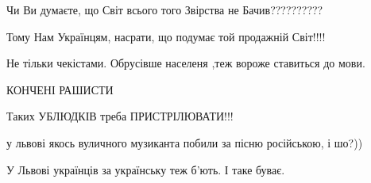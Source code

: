 \begin{itemize}
\begin{itemize}
Чи Ви думаєте, що Світ всього того Звірства не Бачив??????????

Тому Нам Українцям, насрати, що подумає той продажній Світ!!!!🖕🖕🖕

\end{itemize}

 
Не тільки чекістами. Обрусівше населеня ,теж вороже ставиться до мови.

 
КОНЧЕНІ РАШИСТИ🤬🤬

 
Таких УБЛЮДКІВ треба ПРИСТРІЛЮВАТИ!!!

 
у львові якось вуличного музиканта побили за пісню російською, і шо?))

\begin{itemize}
 
У Львові українців за українську теж б'ють. І таке буває.

 

\end{itemize}
\end{itemize}
